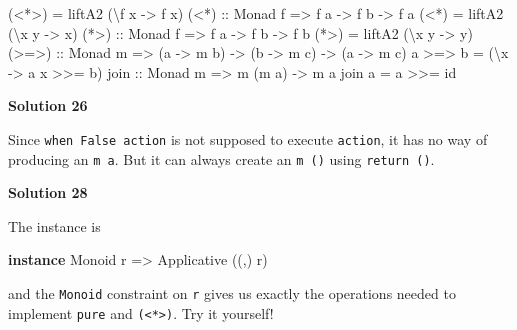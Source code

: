 \documentclass[11pt,
  american,
  DIV13]{article}
\newenvironment{Shaded}{}{}
\newcommand{\DataTypeTok}[1]{\textcolor[rgb]{0.56,0.13,0.00}{#1}}
\newcommand{\FunctionTok}[1]{\textcolor[rgb]{0.02,0.16,0.49}{#1}}
\newcommand{\KeywordTok}[1]{\textcolor[rgb]{0.00,0.44,0.13}{\textbf{#1}}}
\newcommand{\NormalTok}[1]{#1}
\newcommand{\OperatorTok}[1]{\textcolor[rgb]{0.40,0.40,0.40}{#1}}
\newcommand{\OtherTok}[1]{\textcolor[rgb]{0.00,0.44,0.13}{#1}}
\begin{document}
\begin{Shaded}
\begin{Highlighting}[]
\NormalTok{(}\OperatorTok{\textless{}*\textgreater{}}\NormalTok{) }\OtherTok{=}\NormalTok{ liftA2 (\textbackslash{}f x }\OtherTok{{-}\textgreater{}}\NormalTok{ f x)}
\OtherTok{(\textless{}*) ::} \DataTypeTok{Monad}\NormalTok{ f }\OtherTok{=\textgreater{}}\NormalTok{ f a }\OtherTok{{-}\textgreater{}}\NormalTok{ f b }\OtherTok{{-}\textgreater{}}\NormalTok{ f a}
\NormalTok{(}\OperatorTok{\textless{}*}\NormalTok{) }\OtherTok{=}\NormalTok{ liftA2 (\textbackslash{}x y }\OtherTok{{-}\textgreater{}}\NormalTok{ x)}
\OtherTok{(*\textgreater{}) ::} \DataTypeTok{Monad}\NormalTok{ f }\OtherTok{=\textgreater{}}\NormalTok{ f a }\OtherTok{{-}\textgreater{}}\NormalTok{ f b }\OtherTok{{-}\textgreater{}}\NormalTok{ f b}
\NormalTok{(}\OperatorTok{*\textgreater{}}\NormalTok{) }\OtherTok{=}\NormalTok{ liftA2 (\textbackslash{}x y }\OtherTok{{-}\textgreater{}}\NormalTok{ y)}
\OtherTok{(\textgreater{}=\textgreater{}) ::} \DataTypeTok{Monad}\NormalTok{ m }\OtherTok{=\textgreater{}}\NormalTok{ (a }\OtherTok{{-}\textgreater{}}\NormalTok{ m b) }\OtherTok{{-}\textgreater{}}\NormalTok{ (b }\OtherTok{{-}\textgreater{}}\NormalTok{ m c) }\OtherTok{{-}\textgreater{}}\NormalTok{ (a }\OtherTok{{-}\textgreater{}}\NormalTok{ m c)}
\NormalTok{a }\OperatorTok{\textgreater{}=\textgreater{}}\NormalTok{ b }\OtherTok{=}\NormalTok{ (\textbackslash{}x }\OtherTok{{-}\textgreater{}}\NormalTok{ a x }\OperatorTok{\textgreater{}\textgreater{}=}\NormalTok{ b)}
\OtherTok{join ::} \DataTypeTok{Monad}\NormalTok{ m }\OtherTok{=\textgreater{}}\NormalTok{ m (m a) }\OtherTok{{-}\textgreater{}}\NormalTok{ m a}
\NormalTok{join a }\OtherTok{=}\NormalTok{ a }\OperatorTok{\textgreater{}\textgreater{}=} \FunctionTok{id}
\end{Highlighting}
\end{Shaded}

\textbf{Solution 26}

Since \texttt{when\ False\ action} is not supposed to execute
\texttt{action}, it has no way of producing an \texttt{m\ a}. But it can
always create an \texttt{m\ ()} using \texttt{return\ ()}.

\textbf{Solution 28}

The instance is

\begin{Shaded}
\begin{Highlighting}[]
\KeywordTok{instance} \DataTypeTok{Monoid}\NormalTok{ r }\OtherTok{=\textgreater{}} \DataTypeTok{Applicative}\NormalTok{ ((,) r)}
\end{Highlighting}
\end{Shaded}

and the \texttt{Monoid} constraint on \texttt{r} gives us exactly the
operations needed to implement \texttt{pure} and
\texttt{(\textless{}*\textgreater{})}. Try it yourself!
\end{document}
